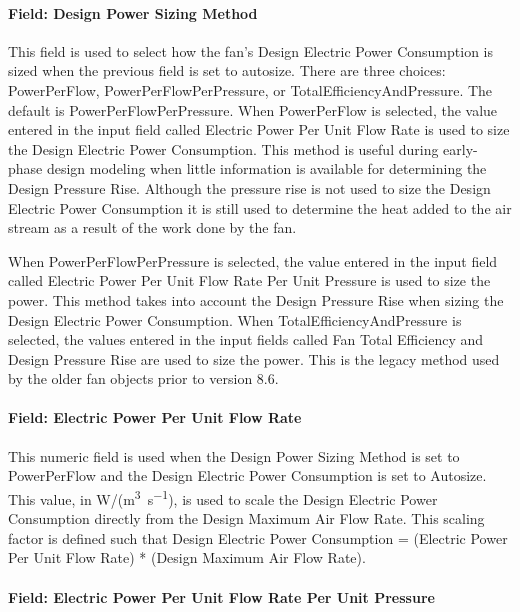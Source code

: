 \paragraph{Field: Design Power Sizing Method}

This field is used to select how the fan's Design Electric Power Consumption is sized when the previous field is set to autosize.  There are three choices: PowerPerFlow, PowerPerFlowPerPressure, or TotalEfficiencyAndPressure.  The default is PowerPerFlowPerPressure.
When PowerPerFlow is selected, the value entered in the input field called Electric Power Per Unit Flow Rate is used to size the Design Electric Power Consumption. This method is useful during early-phase design modeling when little information is available for determining the Design Pressure Rise.  Although the pressure rise is not used to size the Design Electric Power Consumption it is still used to determine the heat added to the air stream as a result of the work done by the fan.

When PowerPerFlowPerPressure is selected, the value entered in the input field called Electric Power Per Unit Flow Rate Per Unit Pressure is used to size the power. This method takes into account the Design Pressure Rise when sizing the Design Electric Power Consumption.
When TotalEfficiencyAndPressure is selected, the values entered in the input fields called Fan Total Efficiency and Design Pressure Rise are used to size the power. This is the legacy method used by the older fan objects prior to version 8.6.

\paragraph{Field: Electric Power Per Unit Flow Rate}\label{field-power-per-unit-flow-fansysmodel}

This numeric field is used when the Design Power Sizing Method is set to PowerPerFlow and the Design Electric Power Consumption is set to Autosize. This value, in W/(\si{\m\cubed\per\s}), is used to scale the Design Electric Power Consumption directly from the Design Maximum Air Flow Rate. This scaling factor is defined such that Design Electric Power Consumption = (Electric Power Per Unit Flow Rate) * (Design Maximum Air Flow Rate).

\paragraph{Field: Electric Power Per Unit Flow Rate Per Unit Pressure}\label{field-power-per-flow-per-pressure-fansysmodel}

